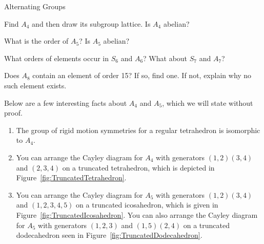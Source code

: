 \begin{section}{Alternating Groups}
\begin{problem}
Find $A_4$ and then draw its subgroup lattice. Is $A_4$ abelian?
\end{problem}

\begin{problem}
What is the order of $A_5$?  Is $A_5$ abelian?
\end{problem}

\begin{problem}
What orders of elements occur in $S_6$ and $A_6$?  What about $S_7$ and $A_7$?
\end{problem}

\begin{problem}
Does $A_8$ contain an element of order 15?  If so, find one.  If not, explain why no such element exists.
\end{problem}

\begin{remark}
Below are a few interesting facts about $A_4$ and $A_5$, which we will state without proof.
\begin{enumerate}[label=\textrm{(\alph*)}]
\item The group of rigid motion symmetries for a regular tetrahedron is isomorphic to $A_4$.
\item You can arrange the Cayley diagram for $A_4$ with generators $(1,2)(3,4)$ and $(2,3,4)$ on a truncated tetrahedron, which is depicted in Figure~\ref{fig:TruncatedTetrahedron}.
\item You can arrange the Cayley diagram for $A_5$ with generators $(1,2)(3,4)$ and $(1,2,3,4,5)$ on a truncated icosahedron, which is given in Figure~\ref{fig:TruncatedIcosahedron}.  You can also arrange the Cayley diagram for $A_5$ with generators $(1,2,3)$ and $(1,5)(2,4)$ on a truncated dodecahedron seen in Figure~\ref{fig:TruncatedDodecahedron}. 
\end{enumerate}
\end{remark}


\end{section}
